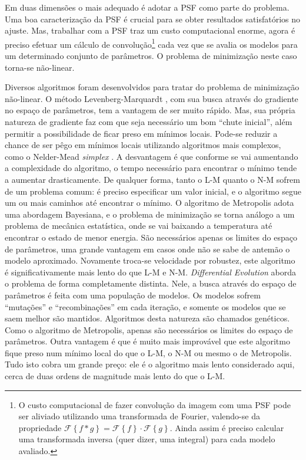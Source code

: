 Em duas dimensões o mais adequado é adotar a PSF como parte do problema. Uma boa
caracterização da PSF é crucial para se obter resultados satisfatórios no
ajuste. Mas, trabalhar com a PSF traz um custo computacional enorme, agora é
preciso efetuar um cálculo de convolução\footnote{O custo computacional de fazer
convolução da imagem com uma PSF pode ser aliviado utilizando uma transformada
de Fourier, valendo-se da propriedade $\mathcal{F}\left\{f \mathbin{*} g\right\}
= \mathcal{F}\left\{f\right\} \cdot \mathcal{F}\left\{g\right\}$. Ainda assim é
preciso calcular uma transformada inversa (quer dizer, uma integral) para cada
modelo avaliado.} cada vez que se avalia os modelos para um determinado conjunto
de parâmetros. O problema de minimização neste caso torna-se não-linear.

Diversos algoritmos foram desenvolvidos para tratar do problema de minimização
não-linear. O método Levenberg-Marquardt \citep[L-M]{Levenberg1944,
Marquardt1963}, com sua busca através do gradiente no espaço de parâmetros, tem
a vantagem de ser muito rápido. Mas, sua própria natureza de gradiente faz com
que seja necessário um bom ``chute inicial'', além permitir a possibilidade de
ficar preso em mínimos locais. Pode-se reduzir a chance de ser pêgo em mínimos
locais utilizando algoritmos mais complexos, como o Nelder-Mead {\em simplex}
\citep[N-M]{Nelder1965}. A desvantagem é que conforme se vai aumentando a
complexidade do algoritmo, o tempo necessário para encontrar o mínimo tende a
aumentar drasticamente. De qualquer forma, tanto o L-M quanto o N-M sofrem de um
problema comum: é preciso especificar um valor inicial, e o algoritmo segue um
ou mais caminhos até encontrar o mínimo. O algoritmo de Metropolis
\citep{Metropolis1953, Saha1994} adota uma abordagem Bayesiana, e o problema de
minimização se torna análogo a um problema de mecânica estatística, onde se vai
baixando a temperatura até encontrar o estado de menor energia. São necessários
apenas os limites do espaço de parâmetros, uma grande vantagem em casos onde não
se sabe de antemão o modelo aproximado. Novamente troca-se velocidade por
robustez, este algoritmo é significativamente mais lento do que L-M e N-M. {\em
Differential Evolution} \citep[DE]{Storn1997} aborda o problema de forma
completamente distinta. Nele, a busca através do espaço de parâmetros é feita
com uma população de modelos. Os modelos sofrem ``mutações'' e ``recombinações''
em cada iteração, e somente os modelos que se saem melhor são mantidos.
Algoritmos desta natureza são chamados genéticos. Como o algoritmo de
Metropolis, apenas são necessários os limites do espaço de parâmetros. Outra
vantagem é que é muito mais improvável que este algoritmo fique preso num mínimo
local do que o L-M, o N-M ou mesmo o de Metropolis. Tudo isto cobra um grande
preço: ele é o algoritmo mais lento considerado aqui, cerca de duas ordens
de magnitude mais lento do que o L-M.

